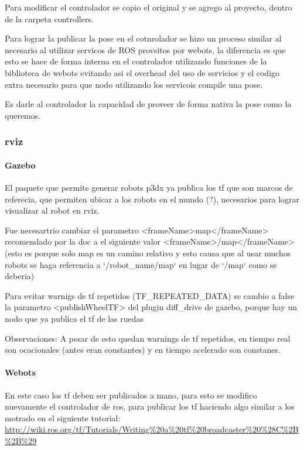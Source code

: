 Para modificar el controlador se copio el original y se agrego al proyecto, dentro de la carpeta controllers.

Para lograr la publicar la pose en el cotnrolador se hizo un proceso similar al necesario al utilizar servicos de ROS provsitos por webots, la diferencia es que esto se hace de forma interna en el controlador utilizando funciones de la biblioteca de webots evitando asi el overhead del uso de servicios  y el codigo extra necesario para que nodo utilizando los servicois compile una pose.

Es darle al controlador la capacidad de proveer de forma nativa la pose como la queremos.

\subsubsection{rviz}
\paragraph{Gazebo}
El paquete que permite generar robots p3dx ya publica los tf que son marcos de referecia, que permiten ubicar a los robots en el mundo (?), necesarios para lograr visualizar al robot en rviz.

Fue necesartrio cambiar el parametro <frameName>map</frameName>\\ recomendado por la doc a el siguiente valor <frameName>/map</frameName>\\ (esto es porque solo map es un camino relativo y esto causa que al usar muchos robots se haga referencia a `/robot\_name/map` en lugar de `/map` como se deberia)

Para evitar warnigs de tf repetidos (TF\_REPEATED\_DATA) se cambio a false la parametro	<publishWheelTF>  del plugin diff\_drive de gazebo, porque hay un nodo que ya publica el tf de las ruedas

Observaciones: A pesar de esto quedan warnings de tf repetidos, en tiempo real son ocacionales (antes eran constantes) y en tiempo acelerado son constanes.

\paragraph{Webots}
En este caso los tf deben ser publicados a mano, para esto se modifico nuevamente el controlador de ros, para publicar los tf haciendo algo similar a los motrado en el siguiente tutorial:
\url{http://wiki.ros.org/tf/Tutorials/Writing%20a%20tf%20broadcaster%20%28C%2B%2B%29}

